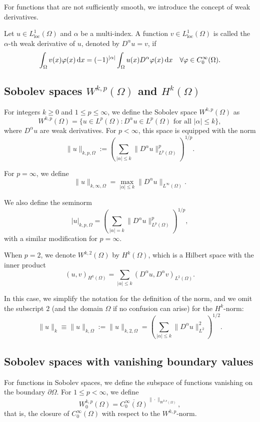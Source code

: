 For functions that are not sufficiently smooth, we introduce the concept of weak derivatives.

\begin{definition}
Let $u \in L^1_{\text{loc}}(\Omega)$ and $\alpha$ be a multi-index. A function $v \in L^1_{\text{loc}}(\Omega)$ is called the $\alpha$-th weak derivative of $u$, denoted by $D^\alpha u = v$, if
\[
  \int_\Omega v(x) \varphi(x) \mathop{}\!\mathrm{d} x =  (-1)^{|\alpha|} \int_\Omega u(x) D^\alpha \varphi(x) \mathop{}\!\mathrm{d} x  \quad \forall \varphi \in C_0^\infty(\Omega).
\]
\end{definition}

\subsection{Sobolev spaces $W^{k,p}(\Omega)$ and $H^k(\Omega)$}

For integers $k \geq 0$ and $1 \leq p \leq \infty$, we define the Sobolev space $W^{k,p}(\Omega)$ as
\[
W^{k,p}(\Omega) = \{u \in L^p(\Omega) : D^\alpha u \in L^p(\Omega) \text{ for all } |\alpha| \leq k\},
\]
where $D^\alpha u$ are weak derivatives. For $p < \infty$, this space is equipped with the norm
\[
\|u\|_{k,p,\Omega} := \left( \sum_{|\alpha| \leq k} \|D^\alpha u\|_{L^p(\Omega)}^p \right)^{1/p}.
\]

For $p = \infty$, we define
\[
\|u\|_{k,\infty,\Omega} = \max_{|\alpha| \leq k} \|D^\alpha u\|_{L^\infty(\Omega)}.
\]

We also define the seminorm
\[
|u|_{k,p,\Omega} = \left( \sum_{|\alpha| = k} \|D^\alpha u\|_{L^p(\Omega)}^p \right)^{1/p},
\]
with a similar modification for $p = \infty$.

When $p = 2$, we denote $W^{k,2}(\Omega)$ by $H^k(\Omega)$, which is a Hilbert space with the inner product
\[
(u, v)_{H^k(\Omega)} = \sum_{|\alpha| \leq k} (D^\alpha u, D^\alpha v)_{L^2(\Omega)}.
\]

In this case, we simplify the notation for the definition of the norm, and we omit the subscript $2$ (and the domain $\Omega$ if no confusion can arise) for the $H^k$-norm:
\[
  \|u\|_{k} \equiv \|u\|_{k,\Omega} := \|u\|_{k,2,\Omega} = \left( \sum_{|\alpha| \leq k} \|D^\alpha u\|_{L^2}^2 \right)^{1/2}.
\]

\subsection{Sobolev spaces with vanishing boundary values}

For functions in Sobolev spaces, we define the subspace of functions vanishing on the boundary $\partial\Omega$. For $1 \leq p < \infty$, we define
\[
W_0^{k,p}(\Omega) = \overline{C_0^\infty(\Omega)}^{\|\cdot\|_{W^{k,p}(\Omega)}},
\]
that is, the closure of $C_0^\infty(\Omega)$ with respect to the $W^{k,p}$-norm.

